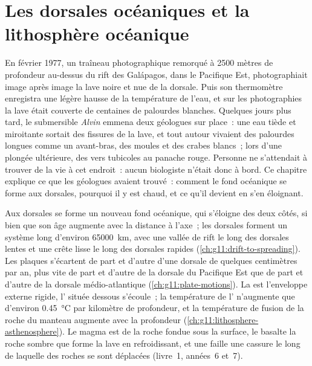 \chapter{Les dorsales océaniques et la lithosphère océanique}\label{ch:g11:ocean-ridges}

En février 1977, un traîneau photographique remorqué à 2500 mètres de
profondeur au-dessus du rift des Galápagos, dans le Pacifique Est,
photographiait image après image la lave noire et nue de la dorsale. Puis
son thermomètre enregistra une légère hausse de la température de l'eau, et
sur les photographies la lave était couverte de centaines de palourdes
blanches. Quelques jours plus tard, le submersible \emph{Alvin} emmena deux
géologues sur place~: une eau tiède et miroitante sortait des fissures de
la lave, et tout autour vivaient des palourdes longues comme un avant-bras,
des moules et des crabes blancs~; lors d'une plongée ultérieure, des vers
tubicoles au panache rouge. Personne ne s'attendait à trouver de la vie à
cet endroit~: aucun biologiste n'était donc à bord. Ce chapitre explique ce
que les géologues avaient trouvé~: comment le fond océanique se forme aux
dorsales, pourquoi il y est chaud, et ce qu'il devient en s'en éloignant.

\begin{recall}
Aux dorsales se forme un nouveau fond océanique, qui s'éloigne des deux
côtés, si bien que son âge augmente avec la distance à l'axe~; les dorsales
forment un système long d'environ \qty{65000}{km}, avec une vallée de rift
le long des dorsales lentes et une crête lisse le long des dorsales rapides
(\cref{ch:g11:drift-to-spreading}). Les plaques s'écartent de part et
d'autre d'une dorsale de quelques centimètres par an, plus vite de part et
d'autre de la dorsale du Pacifique Est que de part et d'autre de la dorsale
médio-atlantique (\cref{ch:g11:plate-motions}). La  est
l'enveloppe externe rigide, l' située dessous s'écoule~; la
température de l' n'augmente que d'environ \qty{0.45}{\celsius}
par kilomètre de profondeur, et la température de fusion de la roche du
manteau augmente avec la profondeur
(\cref{ch:g11:lithosphere-asthenosphere}). Le magma est de la roche fondue
sous la surface, le basalte la roche sombre que forme la lave en
refroidissant, et une faille une cassure le long de laquelle des roches se
sont déplacées (livre~1, années~6 et~7).
\end{recall}

